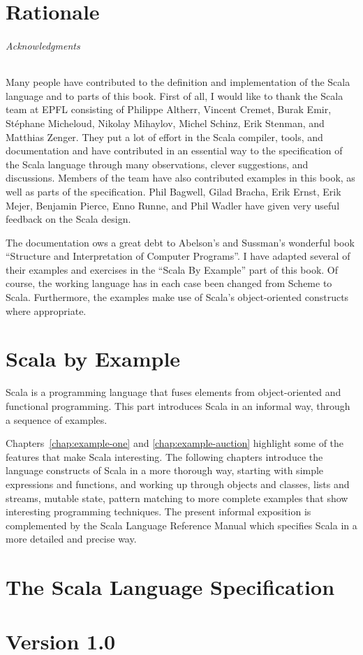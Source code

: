 \documentclass[a4paper,12pt,twoside,titlepage]{book}
\begin{document}
\frontmatter
\makedoctitle
\clearemptydoublepage
\tableofcontents
\mainmatter
\sloppy

\part{Rationale}



\paragraph{Acknowledgments}
Many people have contributed to the definition and implementation of
the Scala language and to parts of this book. First of all, I would
like to thank the Scala team at EPFL consisting of Philippe Altherr,
Vincent Cremet, Burak Emir, St\'ephane Micheloud, Nikolay Mihaylov,
Michel Schinz, Erik Stenman, and Matthias Zenger. They put a lot of
effort in the Scala compiler, tools, and documentation and have
contributed in an essential way to the specification of the Scala
language through many observations, clever suggestions, and
discussions. Members of the team have also contributed examples in
this book, as well as parts of the specification. Phil Bagwell, Gilad
Bracha, Erik Ernst, Erik Mejer, Benjamin Pierce, Enno Runne, and Phil
Wadler have given very useful feedback on the Scala design. 

The documentation ows a great debt to Abelson's and Sussman's
wonderful book ``Structure and Interpretation of Computer
Programs''\cite{abelson-sussman:structure}. I have adapted several of
their examples and exercises in the ``Scala By Example'' part of this
book. Of course, the working language has in each case been changed
from Scheme to Scala. Furthermore, the examples make use of Scala's
object-oriented constructs where appropriate.

\part{Scala by Example}

Scala is a programming language that fuses elements from
object-oriented and functional programming. This part introduces Scala
in an informal way, through a sequence of examples.

Chapters~\ref{chap:example-one} and \ref{chap:example-auction}
highlight some of the features that make Scala interesting. The
following chapters introduce the language constructs of Scala in a
more thorough way, starting with simple expressions and functions, and
working up through objects and classes, lists and streams, mutable
state, pattern matching to more complete examples that show
interesting programming techniques. The present informal exposition is
complemented by the Scala Language Reference Manual which specifies
Scala in a more detailed and precise way.



\part{The Scala Language Specification \\ \ \\ \Large Version 1.0}





\appendix


\end{document}
